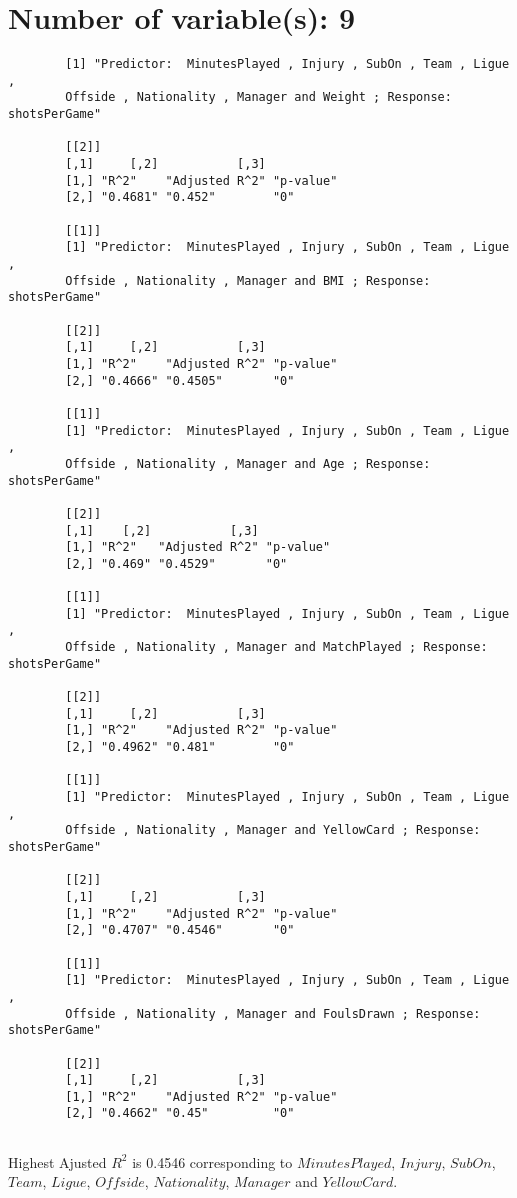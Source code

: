 \documentclass[12pt]{article}
\begin{document}
	\section{Number of variable(s): 9}
	\begin{verbatim}
		[1] "Predictor:  MinutesPlayed , Injury , SubOn , Team , Ligue , 
		Offside , Nationality , Manager and Weight ; Response:  shotsPerGame"
		
		[[2]]
		[,1]     [,2]           [,3]     
		[1,] "R^2"    "Adjusted R^2" "p-value"
		[2,] "0.4681" "0.452"        "0"      
		
		[[1]]
		[1] "Predictor:  MinutesPlayed , Injury , SubOn , Team , Ligue , 
		Offside , Nationality , Manager and BMI ; Response:  shotsPerGame"
		
		[[2]]
		[,1]     [,2]           [,3]     
		[1,] "R^2"    "Adjusted R^2" "p-value"
		[2,] "0.4666" "0.4505"       "0"      
		
		[[1]]
		[1] "Predictor:  MinutesPlayed , Injury , SubOn , Team , Ligue , 
		Offside , Nationality , Manager and Age ; Response:  shotsPerGame"
		
		[[2]]
		[,1]    [,2]           [,3]     
		[1,] "R^2"   "Adjusted R^2" "p-value"
		[2,] "0.469" "0.4529"       "0"      
		
		[[1]]
		[1] "Predictor:  MinutesPlayed , Injury , SubOn , Team , Ligue , 
		Offside , Nationality , Manager and MatchPlayed ; Response:  shotsPerGame"
		
		[[2]]
		[,1]     [,2]           [,3]     
		[1,] "R^2"    "Adjusted R^2" "p-value"
		[2,] "0.4962" "0.481"        "0"      
		
		[[1]]
		[1] "Predictor:  MinutesPlayed , Injury , SubOn , Team , Ligue , 
		Offside , Nationality , Manager and YellowCard ; Response:  shotsPerGame"
		
		[[2]]
		[,1]     [,2]           [,3]     
		[1,] "R^2"    "Adjusted R^2" "p-value"
		[2,] "0.4707" "0.4546"       "0"      
		
		[[1]]
		[1] "Predictor:  MinutesPlayed , Injury , SubOn , Team , Ligue , 
		Offside , Nationality , Manager and FoulsDrawn ; Response:  shotsPerGame"
		
		[[2]]
		[,1]     [,2]           [,3]     
		[1,] "R^2"    "Adjusted R^2" "p-value"
		[2,] "0.4662" "0.45"         "0"      
		
	\end{verbatim}
		Highest Ajusted $ R^2 $ is 0.4546 corresponding to $ MinutesPlayed $, $ Injury $, $ SubOn $, $ Team $, $ Ligue $, $ Offside $, $ Nationality $, $ Manager $ and $ YellowCard $.
	
\end{document}
